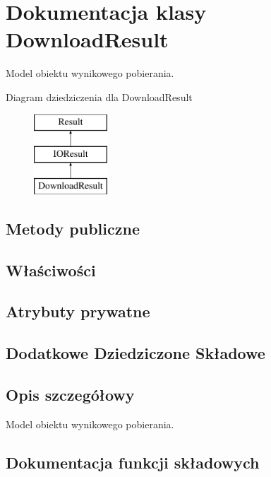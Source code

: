 \hypertarget{a00018}{}\section{Dokumentacja klasy Download\+Result}
\label{a00018}


Model obiektu wynikowego pobierania.  


Diagram dziedziczenia dla Download\+Result\begin{figure}[H]
\begin{center}
\leavevmode
\includegraphics[height=3.000000cm]{d1/d2b/a00018}
\end{center}
\end{figure}
\subsection*{Metody publiczne}
\subsection*{Właściwości}
\subsection*{Atrybuty prywatne}
\subsection*{Dodatkowe Dziedziczone Składowe}


\subsection{Opis szczegółowy}
Model obiektu wynikowego pobierania. 



\subsection{Dokumentacja funkcji składowych}
\hypertarget{a00018_a8b19835453a61a30ab914c4110e3e87c}{}
